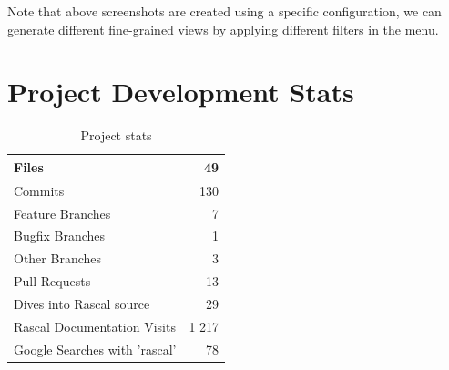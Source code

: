 \documentclass{article}
\begin{document}
Note that above screenshots are created using a specific configuration, we can generate different fine-grained views by applying different filters in the menu.

\section{Project Development Stats}

\begin{table}[!htb]
\caption{Project stats}
\begin{tabular}{l|r}	
		\hline
		Files										&			49 \\
		\hline
		Commits										&			130 \\
		\hline
		Feature Branches							&			7 \\
		\hline
		Bugfix Branches								&			1 \\
		\hline
		Other Branches								&			3 \\
		\hline	
		Pull Requests								&			13 \\
		\hline	
		Dives into Rascal source					&			29 \\
		\hline		
		Rascal Documentation Visits					&			1 217 \\ %
		\hline		
		Google Searches with 'rascal'				&			78 \\	%
		\hline		
\end{tabular}
\end{table}
\end{document}
